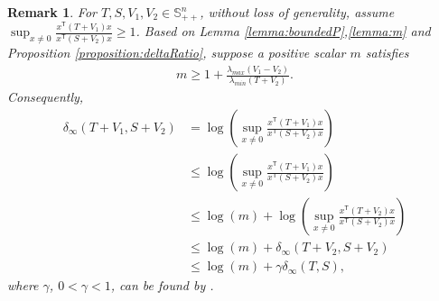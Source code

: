 \documentclass[letterpaper, 10 pt, conference]{ieeeconf}  %
\newcommand{\transpose}{\mathsf{T}}
\newcommand{\quadinner}[1]{x^{\transpose}(#1)x}
\newtheorem{remark}{Remark}
\begin{document}
\begin{remark}\label{remark:delta}
    For $T,S,V_{1},V_{2}\in \mathbb{S}_{++}^{n}$, without loss of generality, assume
    $\sup_{x\neq 0} \frac{\quadinner{T+V_{1}}}{\quadinner{S+V_{2}}} \geq 1$.
    Based on Lemma \ref{lemma:boundedP},\ref{lemma:m} and Proposition \ref{proposition:deltaRatio}, suppose a positive scalar $m$ satisfies
    \begin{align*}
        m \geq 1+\frac{\lambda_{max}(V_{1}-V_{2})}{\lambda_{min}(T+V_{2})}.
    \end{align*}
   Consequently, 
    \begin{align*}
        \delta_{\infty}(T+V_{1},S+V_{2}) &= \log( \sup_{x\neq 0} \frac{\quadinner{T+V_{1}}}{\quadinner{S+V_{2}}})\\
        &\leq \log(\sup_{x\neq 0} \frac{\quadinner{T+V_{1}}}{\quadinner{S+V_{2}}})\\
        &\leq \log(m)+\log(\sup_{x\neq 0} \frac{\quadinner{T+V_{2}}}{\quadinner{S+V_{2}}})\\
        &\leq \log(m) + \delta_{\infty}(T+V_{2},S+V_{2})\\
        &\leq \log(m) + \gamma\delta_{\infty}(T,S),
    \end{align*}
    where $\gamma$, $0<\gamma<1$, can be found by \cite[Lemma D.2]{krauth_finite-time_2019}.
\end{remark}
\end{document}
